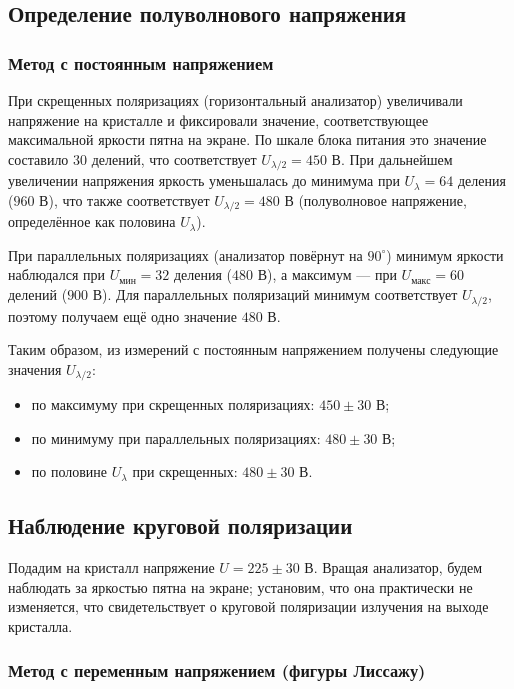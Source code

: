 \documentclass[a4paper]{article}
\begin{document}
\subsection*{Определение полуволнового напряжения}

\subsubsection*{Метод с постоянным напряжением}

При скрещенных поляризациях (горизонтальный анализатор) увеличивали напряжение на кристалле и фиксировали значение, соответствующее максимальной яркости пятна на экране. По шкале блока питания это значение составило $30$ делений, что соответствует $U_{\lambda/2} = 450$ В. При дальнейшем увеличении напряжения яркость уменьшалась до минимума при $U_{\lambda} = 64$ деления ($960$ В), что также соответствует $U_{\lambda/2} = 480$ В (полуволновое напряжение, определённое как половина $U_{\lambda}$).

При параллельных поляризациях (анализатор повёрнут на $90^\circ$) минимум яркости наблюдался при $U_{\text{мин}} = 32$ деления ($480$ В), а максимум — при $U_{\text{макс}} = 60$ делений ($900$ В). Для параллельных поляризаций минимум соответствует $U_{\lambda/2}$, поэтому получаем ещё одно значение $480$ В.

Таким образом, из измерений с постоянным напряжением получены следующие значения $U_{\lambda/2}$:
\begin{itemize}
    \item по максимуму при скрещенных поляризациях: $450 \pm 30$ В;
    \item по минимуму при параллельных поляризациях: $480 \pm 30$ В;
    \item по половине $U_{\lambda}$ при скрещенных: $480 \pm 30$ В.
\end{itemize}

\subsection*{Наблюдение круговой поляризации}
Подадим на кристалл напряжение $U = 225 \pm 30$ В. Вращая анализатор, будем наблюдать за яркостью пятна на экране; установим, что она практически не изменяется, что свидетельствует о круговой поляризации излучения на выходе кристалла.

\subsubsection*{Метод с переменным напряжением (фигуры Лиссажу)}
\end{document}
